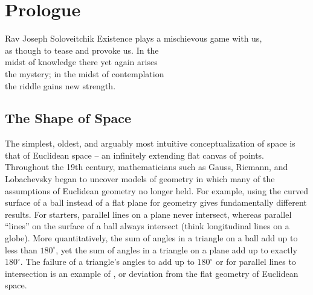 \chapter*{Prologue}

\begin{epigraph}{19.5em}{Rav Joseph Soloveitchik}
	Existence plays a mischievous game with us,\\
	as though to tease and provoke us. In the \\
	midst of knowledge there yet again arises \\
	the mystery; in the midst of contemplation\\
	the riddle gains new strength.
\end{epigraph}
%
\section*{The Shape of Space}

The simplest, oldest, and arguably most intuitive conceptualization of space is that of Euclidean space -- an infinitely extending flat canvas of points.
Throughout the 19th century, mathematicians such as Gauss, Riemann, and Lobachevsky began to uncover models of geometry in which many of the assumptions of Euclidean geometry no longer held.
For example, using the curved surface of a ball instead of a flat plane for geometry gives fundamentally different results. For starters, parallel lines on a plane never intersect, whereas parallel ``lines'' on the surface of a ball always intersect (think longitudinal lines on a globe).
More quantitatively, the sum of angles in a triangle on a ball add up to less than $180^\circ$, yet the sum of angles in a triangle on a plane add up to exactly $180^\circ$. The failure of a triangle's angles to add up to $180^\circ$ or for parallel lines to intersection is an example of , or deviation from the flat geometry of Euclidean space.

